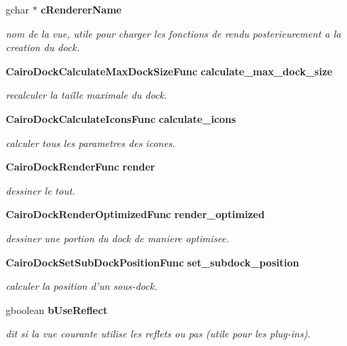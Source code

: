 \begin{CompactItemize}
gchar $\ast$ {\bf cRendererName}
\begin{CompactList}\small\item\em nom de la vue, utile pour charger les fonctions de rendu posterieurement a la creation du dock. \item\end{CompactList}\item 
{\bf CairoDockCalculateMaxDockSizeFunc} {\bf calculate\_\-max\_\-dock\_\-size}
\begin{CompactList}\small\item\em recalculer la taille maximale du dock. \item\end{CompactList}\item 
{\bf CairoDockCalculateIconsFunc} {\bf calculate\_\-icons}
\begin{CompactList}\small\item\em calculer tous les parametres des icones. \item\end{CompactList}\item 
{\bf CairoDockRenderFunc} {\bf render}
\begin{CompactList}\small\item\em dessiner le tout. \item\end{CompactList}\item 
{\bf CairoDockRenderOptimizedFunc} {\bf render\_\-optimized}
\begin{CompactList}\small\item\em dessiner une portion du dock de maniere optimisee. \item\end{CompactList}\item 
{\bf CairoDockSetSubDockPositionFunc} {\bf set\_\-subdock\_\-position}
\begin{CompactList}\small\item\em calculer la position d'un sous-dock. \item\end{CompactList}\item 
gboolean {\bf bUseReflect}
\begin{CompactList}\small\item\em dit si la vue courante utilise les reflets ou pas (utile pour les plug-ins). \item\end{CompactList}\end{CompactItemize}


